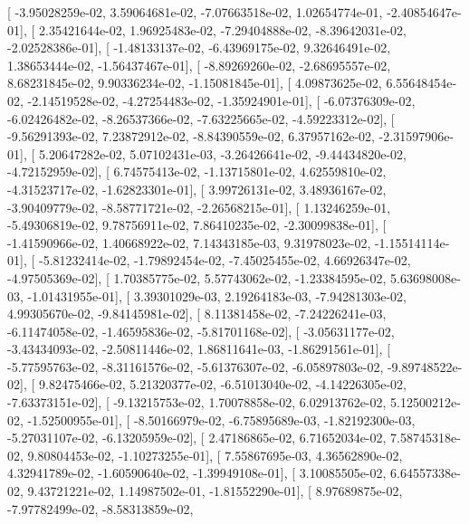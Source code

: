 \documentclass{article}
\begin{document}
       [ -3.95028259e-02,   3.59064681e-02,  -7.07663518e-02,
          1.02654774e-01,  -2.40854647e-01],
       [  2.35421644e-02,   1.96925483e-02,  -7.29404888e-02,
         -8.39642031e-02,  -2.02528386e-01],
       [ -1.48133137e-02,  -6.43969175e-02,   9.32646491e-02,
          1.38653444e-02,  -1.56437467e-01],
       [ -8.89269260e-02,  -2.68695557e-02,   8.68231845e-02,
          9.90336234e-02,  -1.15081845e-01],
       [  4.09873625e-02,   6.55648454e-02,  -2.14519528e-02,
         -4.27254483e-02,  -1.35924901e-01],
       [ -6.07376309e-02,  -6.02426482e-02,  -8.26537366e-02,
         -7.63225665e-02,  -4.59223312e-02],
       [ -9.56291393e-02,   7.23872912e-02,  -8.84390559e-02,
          6.37957162e-02,  -2.31597906e-01],
       [  5.20647282e-02,   5.07102431e-03,  -3.26426641e-02,
         -9.44434820e-02,  -4.72152959e-02],
       [  6.74575413e-02,  -1.13715801e-02,   4.62559810e-02,
         -4.31523717e-02,  -1.62823301e-01],
       [  3.99726131e-02,   3.48936167e-02,  -3.90409779e-02,
         -8.58771721e-02,  -2.26568215e-01],
       [  1.13246259e-01,  -5.49306819e-02,   9.78756911e-02,
          7.86410235e-02,  -2.30099838e-01],
       [ -1.41590966e-02,   1.40668922e-02,   7.14343185e-03,
          9.31978023e-02,  -1.15514114e-01],
       [ -5.81232414e-02,  -1.79892454e-02,  -7.45025455e-02,
          4.66926347e-02,  -4.97505369e-02],
       [  1.70385775e-02,   5.57743062e-02,  -1.23384595e-02,
          5.63698008e-03,  -1.01431955e-01],
       [  3.39301029e-03,   2.19264183e-03,  -7.94281303e-02,
          4.99305670e-02,  -9.84145981e-02],
       [  8.11381458e-02,  -7.24226241e-03,  -6.11474058e-02,
         -1.46595836e-02,  -5.81701168e-02],
       [ -3.05631177e-02,  -3.43434093e-02,  -2.50811446e-02,
          1.86811641e-03,  -1.86291561e-01],
       [ -5.77595763e-02,  -8.31161576e-02,  -5.61376307e-02,
         -6.05897803e-02,  -9.89748522e-02],
       [  9.82475466e-02,   5.21320377e-02,  -6.51013040e-02,
         -4.14226305e-02,  -7.63373151e-02],
       [ -9.13215753e-02,   1.70078858e-02,   6.02913762e-02,
          5.12500212e-02,  -1.52500955e-01],
       [ -8.50166979e-02,  -6.75895689e-03,  -1.82192300e-03,
         -5.27031107e-02,  -6.13205959e-02],
       [  2.47186865e-02,   6.71652034e-02,   7.58745318e-02,
          9.80804453e-02,  -1.10273255e-01],
       [  7.55867695e-03,   4.36562890e-02,   4.32941789e-02,
         -1.60590640e-02,  -1.39949108e-01],
       [  3.10085505e-02,   6.64557338e-02,   9.43721221e-02,
          1.14987502e-01,  -1.81552290e-01],
       [  8.97689875e-02,  -7.97782499e-02,  -8.58313859e-02,
\end{document}
